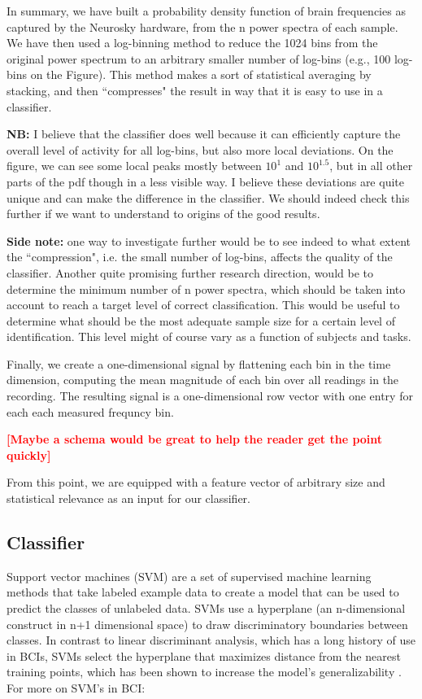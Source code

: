 In summary, we have built a probability density function of brain frequencies as captured by the Neurosky hardware, from the n power spectra of each sample. We have then used a log-binning method to reduce the 1024 bins from the original power spectrum to an arbitrary smaller number of log-bins (e.g., 100 log-bins on the Figure). This method makes a sort of statistical averaging by stacking, and then ``compresses" the result in way that it is easy to use in a classifier.

{\bf NB:} I believe that the classifier does well because it can efficiently capture the overall level of activity for all log-bins, but also more local deviations. On the figure, we can see some local peaks mostly between $10^1$ and $10^1.5$, but in all other parts of the pdf though in a less visible way. I believe these deviations are quite unique and can make the difference in the classifier. We should indeed check this further if we want to understand to origins of the good results.

{\bf Side note:} one way to investigate further would be to see indeed to what extent the ``compression", i.e. the small number of log-bins, affects the quality of the classifier. Another quite promising further research direction, would be to determine the minimum number of n power spectra, which should be taken into account to reach a target level of correct classification. This would be useful to determine what should be the most adequate sample size for a certain level of identification. This level might of course vary as a function of subjects and tasks.


Finally, we create a one-dimensional signal by flattening each bin in the time dimension, computing the mean magnitude of each bin over all readings in the recording. The resulting signal is a one-dimensional row vector with one entry for each each measured frequncy bin.

\textcolor{red}{\bf [Maybe a schema would be great to help the reader get the point quickly]}

From this point, we are equipped with a feature vector of arbitrary size and statistical relevance as an input for our classifier.

\subsection{Classifier}

Support vector machines (SVM) are a set of supervised machine learning methods that take labeled example data to create a model that can be used to predict the classes of unlabeled data. SVMs use a hyperplane (an n-dimensional construct in n+1 dimensional space) to draw discriminatory boundaries between classes. In contrast to linear discriminant analysis, which has a long history of use in BCIs, SVMs select the hyperplane that maximizes distance from the nearest training points, which has been shown to increase the model's generalizability \cite{burges_tutorial_1998}.  For more on SVM's in BCI: \cite{garrett_comparison_2003,grierson_better_2011} 

